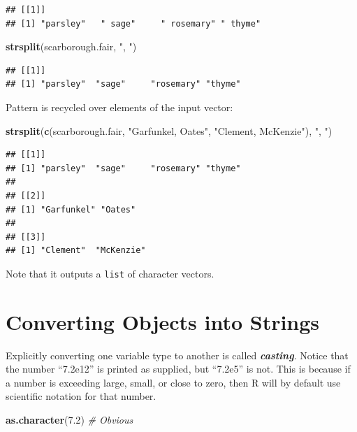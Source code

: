 \documentclass[
]{book}
\newenvironment{Shaded}{\begin{snugshade}}{\end{snugshade}}
\newcommand{\CommentTok}[1]{\textcolor[rgb]{0.56,0.35,0.01}{\textit{#1}}}
\newcommand{\FloatTok}[1]{\textcolor[rgb]{0.00,0.00,0.81}{#1}}
\newcommand{\KeywordTok}[1]{\textcolor[rgb]{0.13,0.29,0.53}{\textbf{#1}}}
\newcommand{\NormalTok}[1]{#1}
\newcommand{\StringTok}[1]{\textcolor[rgb]{0.31,0.60,0.02}{#1}}
\begin{document}
\begin{verbatim}
## [[1]]
## [1] "parsley"   " sage"     " rosemary" " thyme"
\end{verbatim}

\begin{Shaded}
\begin{Highlighting}[]
\KeywordTok{strsplit}\NormalTok{(scarborough.fair, }\StringTok{", "}\NormalTok{)}
\end{Highlighting}
\end{Shaded}

\begin{verbatim}
## [[1]]
## [1] "parsley"  "sage"     "rosemary" "thyme"
\end{verbatim}

Pattern is recycled over elements of the input vector:

\begin{Shaded}
\begin{Highlighting}[]
\KeywordTok{strsplit}\NormalTok{(}\KeywordTok{c}\NormalTok{(scarborough.fair, }\StringTok{"Garfunkel, Oates"}\NormalTok{, }\StringTok{"Clement, McKenzie"}\NormalTok{),}
    \StringTok{", "}\NormalTok{)}
\end{Highlighting}
\end{Shaded}

\begin{verbatim}
## [[1]]
## [1] "parsley"  "sage"     "rosemary" "thyme"   
## 
## [[2]]
## [1] "Garfunkel" "Oates"    
## 
## [[3]]
## [1] "Clement"  "McKenzie"
\end{verbatim}

Note that it outputs a \texttt{list} of character vectors.

\hypertarget{converting-objects-into-strings}{%
\section{Converting Objects into Strings}\label{converting-objects-into-strings}}

Explicitly converting one variable type to another is called \textbf{\emph{casting}}. Notice that the number ``7.2e12'' is printed as supplied, but ``7.2e5'' is not. This is because if a number is exceeding large, small, or close to zero, then R will by default use scientific notation for that number.

\begin{Shaded}
\begin{Highlighting}[]
\KeywordTok{as.character}\NormalTok{(}\FloatTok{7.2}\NormalTok{)  }\CommentTok{# Obvious}
\end{Highlighting}
\end{Shaded}
\end{document}

